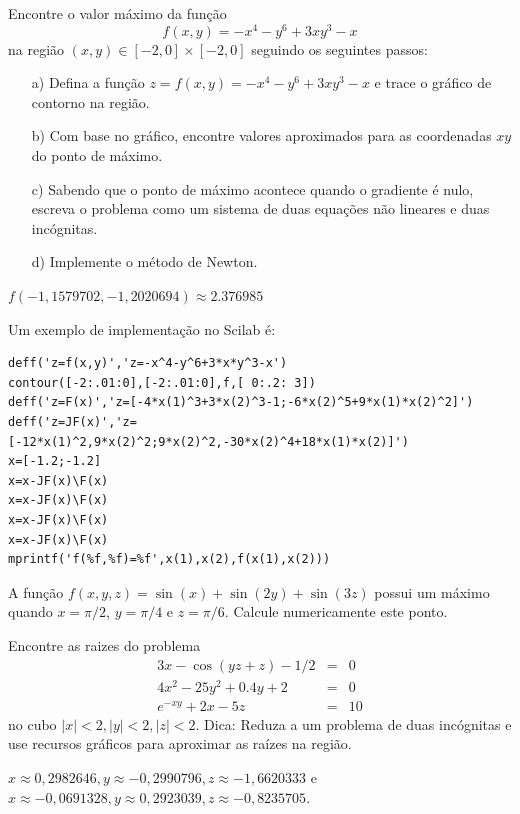\begin{exer}Encontre o valor máximo da função $$f(x,y)=-x^4-y^6+3xy^3-x$$ na região $(x,y)\in [-2,0]\times [-2,0]$
 seguindo os seguintes passos:
\begin{itemize}
  \item[a)] Defina a função $z=f(x,y)=-x^4-y^6+3xy^3-x$ e trace o gráfico de contorno na região.
  \item[b)] Com base no gráfico, encontre valores aproximados para as coordenadas $xy$ do ponto de máximo.
  \item[c)] Sabendo que o ponto de máximo acontece quando o gradiente é nulo, escreva o problema como um sistema de duas equações não lineares e duas incógnitas.
  \item[d)] Implemente o método de Newton.
\end{itemize}
\end{exer}
 \begin{resp}
 $f(-1,1579702, -1,2020694)\approx 2.376985$

\ifisscilab
Um exemplo de implementação no Scilab é:
\begin{verbatim}
deff('z=f(x,y)','z=-x^4-y^6+3*x*y^3-x')
contour([-2:.01:0],[-2:.01:0],f,[ 0:.2: 3])
deff('z=F(x)','z=[-4*x(1)^3+3*x(2)^3-1;-6*x(2)^5+9*x(1)*x(2)^2]')
deff('z=JF(x)','z=[-12*x(1)^2,9*x(2)^2;9*x(2)^2,-30*x(2)^4+18*x(1)*x(2)]')
x=[-1.2;-1.2]
x=x-JF(x)\F(x)
x=x-JF(x)\F(x)
x=x-JF(x)\F(x)
x=x-JF(x)\F(x)
mprintf('f(%f,%f)=%f',x(1),x(2),f(x(1),x(2)))
\end{verbatim}
\fi
\end{resp}

\begin{exer}A função $f(x,y,z)=\sin(x)+\sin(2y)+\sin(3z)$ possui um máximo quando $x=\pi/2$, $y=\pi/4$ e $z=\pi/6$. Calcule numericamente este ponto.
\end{exer}
\begin{resp}
  \construirResp
\end{resp}


\begin{exer}\label{prob_sis3} Encontre as raizes do problema
  \begin{eqnarray*}
    3x-\cos(yz+z)-1/2&=&0\\
    4x^2-25y^2+0.4y+2&=&0\\
    e^{-xy}+2x-5z&=&10
  \end{eqnarray*}
  no cubo $|x|<2, |y|<2, |z|<2.$
  Dica: Reduza a um problema de duas incógnitas e use recursos gráficos para aproximar as raízes na região.
\end{exer}
\begin{resp}
  $x\approx 0,2982646, y\approx -0,2990796, z\approx- 1,6620333$  e $x\approx -0,0691328, y\approx 0,2923039, z\approx -0,8235705$.
\end{resp}

